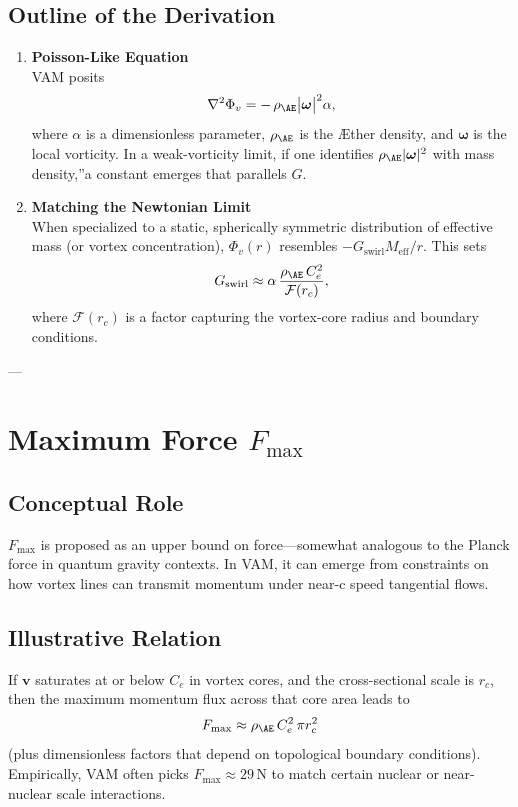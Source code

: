 \documentclass[a4paper,12pt]{article}
\begin{document}
\subsection{Outline of the Derivation}
\begin{enumerate}
    \item \textbf{Poisson-Like Equation} \\
    VAM posits
    \[
        \nabla^2 \Phi_v    =  -\,\rho_{\mathrm{\AE}}\bigl|\boldsymbol{\omega}\bigr|^2  \alpha,
    \]
    where \(\alpha\) is a dimensionless parameter, \(\rho_{\mathrm{\AE}}\) is the Æther density, and \(\boldsymbol{\omega}\) is the local vorticity. In a weak-vorticity limit, if one identifies \(\rho_{\mathrm{\AE}} |\boldsymbol{\omega}|^2\) with \grqq mass density,\textquotedblright a constant emerges that parallels \(G\).

    \item \textbf{Matching the Newtonian Limit} \\
    When specialized to a static, spherically symmetric distribution of effective mass (or vortex concentration), \(\Phi_v(r)\) resembles \(-G_\text{swirl} M_\text{eff}/r\). This sets
    \[
        G_\text{swirl}     \approx     \alpha \,\frac{\rho_{\mathrm{\AE}}\,C_e^2}{\mathcal{F}(r_c)},
    \]
    where \(\mathcal{F}(r_c)\) is a factor capturing the vortex-core radius and boundary conditions.
\end{enumerate}

---

\section{Maximum Force \(F_{\max}\)}

\subsection{Conceptual Role}
\(F_{\max}\) is proposed as an upper bound on force—somewhat analogous to the Planck force in quantum gravity contexts. In VAM, it can emerge from constraints on how vortex lines can transmit momentum under near-c speed tangential flows.

\subsection{Illustrative Relation}
If \(\mathbf{v}\) saturates at or below \(C_e\) in vortex cores, and the cross-sectional scale is \(r_c\), then the maximum momentum flux across that core area leads to
\[
    F_{\max}    \approx  \rho_{\mathrm{\AE}}\, C_e^2\, \pi r_c^2
\]
(plus dimensionless factors that depend on topological boundary conditions). Empirically, VAM often picks \(F_{\max}\approx 29\,\mathrm{N}\) to match certain nuclear or near-nuclear scale interactions.
\end{document}
